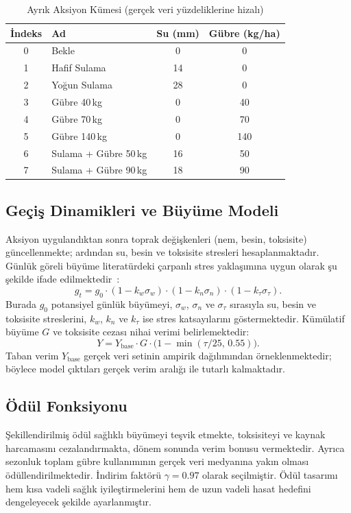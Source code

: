 \documentclass[10pt,twocolumn,a4paper]{article}
\begin{document}
\begin{table}[H]
\centering
\caption{Ayr{\i}k Aksiyon K\"umesi (ger\c{c}ek veri y\"uzdeliklerine hizal{\i})}
\label{tab:actions}
\small
\begin{tabular}{@{}clcc@{}}
\toprule
\.{I}ndeks & Ad & Su (mm) & G\"ubre (kg/ha) \\
\midrule
0 & Bekle & 0 & 0 \\
1 & Hafif Sulama & 14 & 0 \\
2 & Yo\u{g}un Sulama & 28 & 0 \\
3 & G\"ubre 40\,kg & 0 & 40 \\
4 & G\"ubre 70\,kg & 0 & 70 \\
5 & G\"ubre 140\,kg & 0 & 140 \\
6 & Sulama + G\"ubre 50\,kg & 16 & 50 \\
7 & Sulama + G\"ubre 90\,kg & 18 & 90 \\
\bottomrule
\end{tabular}
\end{table}

\subsection{Ge\c{c}i\c{s} Dinamikleri ve B\"uy\"ume Modeli}
Aksiyon uyguland{\i}ktan sonra toprak de\u{g}i\c{s}kenleri (nem, besin, toksisite) g\"uncellenmekte; ard{\i}ndan su, besin ve toksisite stresleri hesaplanmaktad{\i}r. G\"unl\"uk g\"oreli b\"uy\"ume literat\"urdeki \c{c}arpanl{\i} stres yakla\c{s}{\i}m{\i}na uygun olarak \c{s}u \c{s}ekilde ifade edilmektedir~\cite{raes2009aquacrop,doorenbos1979}:
\begin{equation}
g_t = g_0 \cdot (1-k_w\sigma_w)\cdot(1-k_n\sigma_n)\cdot(1-k_\tau\sigma_\tau).
\end{equation}
Burada $g_0$ potansiyel g\"unl\"uk b\"uy\"umeyi, $\sigma_w$, $\sigma_n$ ve $\sigma_\tau$ s{\i}ras{\i}yla su, besin ve toksisite streslerini, $k_w$, $k_n$ ve $k_\tau$ ise stres katsay{\i}lar{\i}n{\i} g\"ostermektedir. K\"um\"ulatif b\"uy\"ume $G$ ve toksisite cezas{\i} nihai verimi belirlemektedir:
\begin{equation}
Y = Y_{\mathrm{base}} \cdot G \cdot \bigl(1-\min(\tau/25,\,0.55)\bigr).
\end{equation}
Taban verim $Y_{\mathrm{base}}$ ger\c{c}ek veri setinin ampirik da\u{g}{\i}l{\i}m{\i}ndan \"orneklenmektedir; b\"oylece model \c{c}{\i}kt{\i}lar{\i} ger\c{c}ek verim aral{\i}\u{g}{\i} ile tutarl{\i} kalmaktad{\i}r.

\subsection{\"Od\"ul Fonksiyonu}
\c{S}ekillendirilmi\c{s} \"od\"ul sa\u{g}l{\i}kl{\i} b\"uy\"umeyi te\c{s}vik etmekte, toksisiteyi ve kaynak harcamas{\i}n{\i} cezaland{\i}rmakta, d\"onem sonunda verim bonusu vermektedir. Ayr{\i}ca sezonluk toplam g\"ubre kullan{\i}m{\i}n{\i}n ger\c{c}ek veri medyan{\i}na yak{\i}n olmas{\i} \"od\"ullendirilmektedir. \.{I}ndirim fakt\"or\"u $\gamma=0.97$ olarak se\c{c}ilmi\c{s}tir. \"Od\"ul tasar{\i}m{\i} hem k{\i}sa vadeli sa\u{g}l{\i}k iyile\c{s}tirmelerini hem de uzun vadeli hasat hedefini dengeleyecek \c{s}ekilde ayarlanm{\i}\c{s}t{\i}r.
\end{document}
